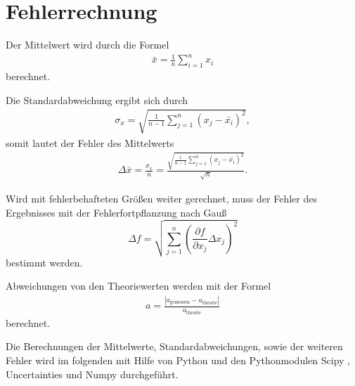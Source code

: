 \section{Fehlerrechnung}
\label{sec:Fehlerrechnung}

Der Mittelwert wird durch die Formel
\begin{align*}
    \bar{x}=\frac{1}{n} \sum_{i=1}^n x_i \label{eqn:Mittelwert}
\end{align*}
berechnet.

Die Standardabweichung ergibt sich durch
\begin{align*}
    \sigma_x=\sqrt{\frac{1}{n-1}\sum_{j=1}^n (x_j-\bar{x_i})^2},
\end{align*}
somit lautet der Fehler des Mittelwerts
\begin{align*}
    \Delta \bar{x}= \frac{\sigma_x}{n} = \frac{\sqrt{\frac{1}{n-1}\sum_{j=1}^n (x_j-\bar{x_i})^2}}{\sqrt{n}}.
\end{align*}

Wird mit fehlerbehafteten Größen weiter gerechnet, muss der Fehler des Ergebnisses mit der Fehlerfortpflanzung nach Gauß
\begin{equation*}
    \Delta f=\sqrt{\sum_{j=1}^n \left(\frac{\partial f}{\partial x_j}\Delta x_j \right)^{2} }\label{eqn:Gauß}
\end{equation*}
bestimmt werden.

Abweichungen von den Theoriewerten werden mit der Formel
\begin{align*}
  a=\frac{|a_\mathrm{gemessen}-a_\mathrm{theorie}|}{a_\mathrm{theorie}} \label{eqn:abweich}
\end{align*}
berechnet.

Die Berechnungen der Mittelwerte, Standardabweichungen, sowie der weiteren Fehler wird im folgenden mit Hilfe von Python und 
den Pythonmodulen Scipy \cite{scipy}, Uncertainties \cite{uncertainties} und Numpy \cite{numpy}
durchgeführt.
